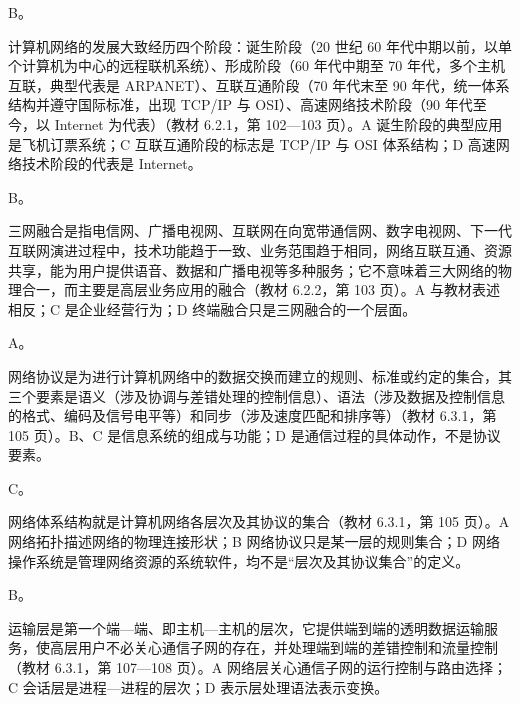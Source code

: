 \documentclass[a4paper,11pt]{article}
\begin{document}


\q B。\begin{analysis}计算机网络的发展大致经历四个阶段：诞生阶段（20 世纪 60 年代中期以前，以单个计算机为中心的远程联机系统）、形成阶段（60 年代中期至 70 年代，多个主机互联，典型代表是 ARPANET）、互联互通阶段（70 年代末至 90 年代，统一体系结构并遵守国际标准，出现 TCP/IP 与 OSI）、高速网络技术阶段（90 年代至今，以 Internet 为代表）（教材 6.2.1，第 102—103 页）。A 诞生阶段的典型应用是飞机订票系统；C 互联互通阶段的标志是 TCP/IP 与 OSI 体系结构；D 高速网络技术阶段的代表是 Internet。\end{analysis}

\q B。\begin{analysis}三网融合是指电信网、广播电视网、互联网在向宽带通信网、数字电视网、下一代互联网演进过程中，技术功能趋于一致、业务范围趋于相同，网络互联互通、资源共享，能为用户提供语音、数据和广播电视等多种服务；它不意味着三大网络的物理合一，而主要是高层业务应用的融合（教材 6.2.2，第 103 页）。A 与教材表述相反；C 是企业经营行为；D 终端融合只是三网融合的一个层面。\end{analysis}

\q A。\begin{analysis}网络协议是为进行计算机网络中的数据交换而建立的规则、标准或约定的集合，其三个要素是语义（涉及协调与差错处理的控制信息）、语法（涉及数据及控制信息的格式、编码及信号电平等）和同步（涉及速度匹配和排序等）（教材 6.3.1，第 105 页）。B、C 是信息系统的组成与功能；D 是通信过程的具体动作，不是协议要素。\end{analysis}

\q C。\begin{analysis}网络体系结构就是计算机网络各层次及其协议的集合（教材 6.3.1，第 105 页）。A 网络拓扑描述网络的物理连接形状；B 网络协议只是某一层的规则集合；D 网络操作系统是管理网络资源的系统软件，均不是“层次及其协议集合”的定义。\end{analysis}

\q B。\begin{analysis}运输层是第一个端—端、即主机—主机的层次，它提供端到端的透明数据运输服务，使高层用户不必关心通信子网的存在，并处理端到端的差错控制和流量控制（教材 6.3.1，第 107—108 页）。A 网络层关心通信子网的运行控制与路由选择；C 会话层是进程—进程的层次；D 表示层处理语法表示变换。\end{analysis}
\end{document}
